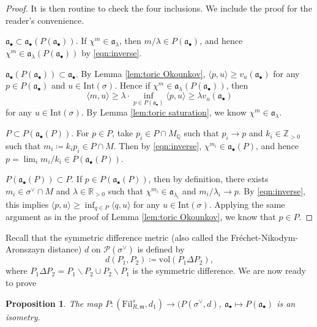 \documentclass[11pt, leqno]{amsart}%
\theoremstyle{plain}
\newtheorem{proposition}[theorem]{Proposition}
\theoremstyle{definition}
\theoremstyle{remark}
\newcommand{\cP}{\mathcal{P}}
\newcommand{\bQ}{\mathbb{Q}}
\newcommand{\bR}{\mathbb{R}}
\newcommand{\bZ}{\mathbb{Z}}
\newcommand{\fa}{\mathfrak{a}}
\newcommand{\fm}{\mathfrak{m}}
\newcommand{\vol}{\mathrm{vol}}
\newcommand{\Int}{\mathrm{Int}}
\newcommand{\Fil}{\mathrm{Fil}}
\numberwithin{equation}{section}
\begin{document}
\begin{proof}
    
    It is then routine to check the four inclusions. We include the proof for the reader's convenience.

    $\fa_\bullet\subset \fa_\bullet(P(\fa_\bullet))$. If $\chi^m\in\fa_\lambda$, then $m/\lambda\in P(\fa_\bullet)$, and hence $\chi^m\in\fa_\lambda(P(\fa_\bullet))$ by \eqref{eqn:inverse}.

    $\fa_\bullet(P(\fa_\bullet))\subset \fa_\bullet$. By Lemma \ref{lem:toric Okounkov}, $\langle p,u \rangle \ge v_u(\fa_\bullet)$ for any $p\in P(\fa_\bullet)$ and $u\in\Int(\sigma)$. Hence if $\chi^m\in\fa_\lambda(P(\fa_\bullet))$, then 
    \[
        \langle m,u \rangle \ge \lambda\cdot \inf_{p\in P(\fa_\bullet)} \langle p,u \rangle \ge \lambda v_u(\fa_\bullet)
    \]
    for any $u\in\Int(\sigma)$. By Lemma \ref{lem:toric saturation}, we know $\chi^m\in\fa_\lambda$. 

    $P\subset P(\fa_\bullet(P))$. For $p\in P$, take $p_i\in P\cap M_\bQ$ such that $p_i\to p$ and $k_i\in\bZ_{>0}$ such that $m_i\coloneqq k_ip_i\in P\cap M$. Then by \eqref{eqn:inverse}, $\chi^{m_i}\in \fa_\bullet(P)$, and hence $p=\lim_i m_i/k_i\in P(\fa_\bullet(P))$. 

    $P(\fa_\bullet(P))\subset P$. If $p\in P(\fa_\bullet(P))$, then by definition, there exists $m_i\in\sigma^\vee\cap M$ and $\lambda\in\bR_{>0}$ such that $\chi^{m_i}\in\fa_{\lambda_i}$ and $m_i/\lambda_i\to p$. By \eqref{eqn:inverse}, this implies $\langle p,u \rangle \ge \inf_{q\in P} \langle q,u \rangle$ for any $u\in\Int(\sigma)$. Applying the same argument as in the proof of Lemma \ref{lem:toric Okounkov}, we know that $p\in P$.
\end{proof}









Recall that the symmetric difference metric (also called the Fr\'echet-Nikodym-Aronszayn distance) $d$ on $\cP(\sigma^\vee)$ is defined by 
\[
    d(P_1,P_2)\coloneqq \vol(P_1\Delta P_2),
\]
where $P_1\Delta P_2=P_1\backslash P_2\cup P_2\backslash P_1$ is the symmetric difference. We are now ready to prove

\begin{proposition}\label{prop:toric isometry}
    The map $P:(\Fil^s_{R,\fm},d_1)\to (P(\sigma^\vee,d)$, $\fa_\bullet\mapsto P(\fa_\bullet)$ is an isometry.
\end{proposition}
\end{document}
